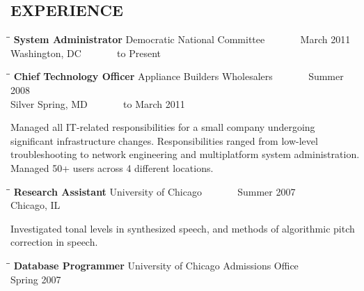 \documentclass{res}
\begin{document}
\begin{resume}
\section{EXPERIENCE}
   \vspace{-0.1in}	
   \begin{tabbing}
   \hspace{2.3in}\= \hspace{2.6in}\= \kill %
    {\bf System Administrator} \>Democratic National Committee \> ~~~~~~ March 2011 \\
                             \>Washington, DC                    \> ~~~~~~ to Present
   \end{tabbing}\vspace{-20pt}      %
   \begin{tabbing}
   \hspace{2.3in}\= \hspace{2.6in}\= \kill %
    {\bf Chief Technology Officer} \>Appliance Builders Wholesalers \> ~~~~~~ Summer 2008 \\
                             \>Silver Spring, MD                    \> ~~~~~~ to March 2011
   \end{tabbing}\vspace{-20pt}      %
    Managed all IT-related responsibilities for a small company undergoing significant infrastructure changes. Responsibilities ranged from low-level troubleshooting to network engineering and multiplatform system administration. Managed 50+ users across 4 different locations.
   \begin{tabbing}
   \hspace{2.3in}\= \hspace{2.6in}\= \kill %
    {\bf Research Assistant} \>University of Chicago \> ~~~~~~ Summer 2007\\
                          \>Chicago, IL
   \end{tabbing}\vspace{-20pt}
   Investigated tonal levels in synthesized speech, and methods of algorithmic pitch correction
   in speech.
   \begin{tabbing}
   \hspace{2.3in}\= \hspace{2.6in}\= \kill %
    {\bf Database Programmer } \>University of Chicago Admissions Office \> ~~~~~~ Spring 2007\\

\end{tabbing}
\end{resume}
\end{document}
